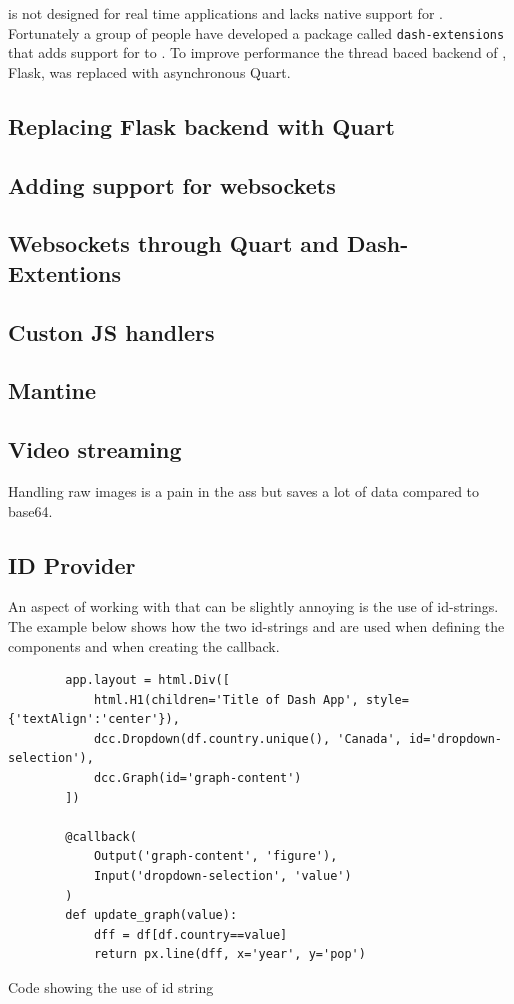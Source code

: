 \dash is not designed for real time applications and lacks native support for .
Fortunately a group of people have developed a package called \texttt{dash-extensions} that adds support for  to \dash \cite{eriksenDashExtensions}.
To improve performance the thread baced backend of \dash, Flask, was replaced with asynchronous Quart.

\subsection{Replacing Flask backend with Quart}

\subsection{Adding support for websockets}

\subsection{Websockets through Quart and Dash-Extentions}

\subsection{Custon JS handlers}

\subsection{Mantine}

\subsection{Video streaming}
Handling raw images is a pain in the ass but saves a lot of data compared to base64.

\subsection{ID Provider}
An aspect of working with \dash that can be slightly annoying is the use of id-strings.
The example below shows how the two id-strings  and  are used when defining the components and when creating the callback.
\begin{listing}[H]
    \begin{verbatim}
        app.layout = html.Div([
            html.H1(children='Title of Dash App', style={'textAlign':'center'}),
            dcc.Dropdown(df.country.unique(), 'Canada', id='dropdown-selection'),
            dcc.Graph(id='graph-content')
        ])

        @callback(
            Output('graph-content', 'figure'),
            Input('dropdown-selection', 'value')
        )
        def update_graph(value):
            dff = df[df.country==value]
            return px.line(dff, x='year', y='pop')
    \end{verbatim}
    \caption{Code showing the use of id string \cite{plotlyMinimalDashApp}}
\end{listing}


